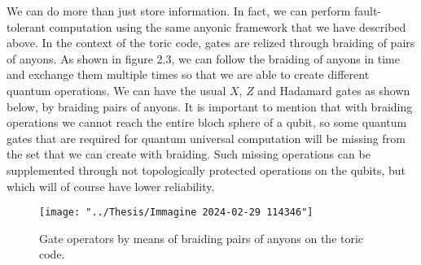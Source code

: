 \documentclass{Configuration_Files/PoliMi3i_thesis}
\begin{document}
We can do more than just store information. In fact, we can perform fault-tolerant computation using the same anyonic framework that we have described above. \newline
In the context of the toric code, gates are relized through braiding of pairs of anyons. As shown in figure 2.3, we can follow the braiding of anyons in time and exchange them multiple times so that we are able to create different quantum operations. \newline
We can have the usual $X$, $Z$ and Hadamard gates as shown below, by braiding pairs of anyons. It is important to mention that with braiding operations we cannot reach the entire bloch sphere of a qubit, so some quantum gates that are required for quantum universal computation will be missing from the set that we can create with braiding. Such missing operations can be supplemented through not topologically protected operations on the qubits, but which will of course have lower reliability. \newline

\begin{figure}
	\centering
	\texttt{[image: "../Thesis/Immagine 2024-02-29 114346"]}
	\caption{Gate operators by means of braiding pairs of anyons on the toric code.}
	\label{fig:immagine-2024-02-29-114346}
\end{figure}
\end{document}
